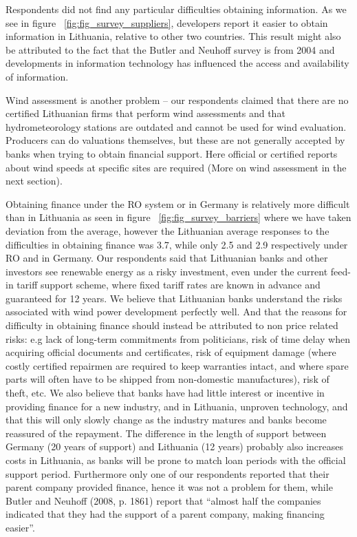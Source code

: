 \documentclass[a4paper, 12pt]{article}
\begin{document}
Respondents did not find any particular difficulties obtaining information. As we see in figure ~\ref{fig:fig_survey_suppliers}, developers report it easier to obtain information in Lithuania, relative to other two countries. This result might also be attributed to the fact that the Butler and Neuhoff survey is from 2004 and developments in information technology has influenced the access and availability of information.

Wind assessment is another problem – our respondents claimed that there are no certified Lithuanian firms that perform wind assessments and that hydrometeorology stations are outdated and cannot be used for wind evaluation. Producers can do valuations themselves, but these are not generally accepted by banks when trying to obtain financial support. Here official or certified reports about wind speeds at specific sites are required (More on wind assessment in the next section).

Obtaining finance under the RO system or in Germany is relatively more difficult than in Lithuania as seen in figure ~\ref{fig:fig_survey_barriers} where we have taken deviation from the average, however the Lithuanian average responses to the difficulties in obtaining finance was 3.7, while only 2.5 and 2.9 respectively under RO and in Germany. Our respondents said that Lithuanian banks and other investors see renewable energy as a risky investment, even under the current feed-in tariff support scheme, where fixed tariff rates are known in advance and guaranteed for 12 years. We believe that Lithuanian banks understand the risks associated with wind power development perfectly well. And that the reasons for difficulty in obtaining finance should instead be attributed to non price related risks: e.g lack of long-term commitments from politicians, risk of time delay when acquiring official documents and certificates, risk of equipment damage (where costly certified repairmen are required to keep warranties intact, and where spare parts will often have to be shipped from non-domestic manufactures), risk of theft, etc. We also believe that banks have had little interest or incentive in providing finance for a new industry, and in Lithuania, unproven technology, and that this will only slowly change as the industry matures and banks become reassured of the repayment. The difference in the length of support between Germany (20 years of support) and Lithuania (12 years) probably also increases costs in Lithuania, as banks will be prone to match loan periods with the official support period. Furthermore only one of our respondents reported that their parent company provided finance, hence it was not a problem for them, while Butler and Neuhoff (2008, p. 1861) report that ``almost half the companies indicated that they had the support of a parent company, making financing easier''. 
\end{document}
